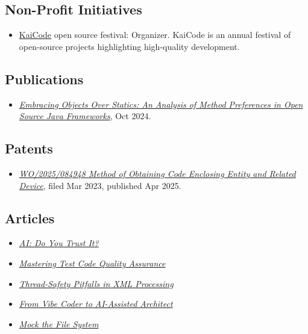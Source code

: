 \documentclass{vl}
\begin{document}
    \subsection*{Non-Profit Initiatives}
    \begin{itemize}
        \itemsep0em
        \item \href{https://www.kaicode.org}{KaiCode} open source festival: Organizer.
        KaiCode is an annual festival of open-source projects highlighting high-quality development.
    \end{itemize}

    \subsection*{Publications}
    \begin{itemize}
        \itemsep0em
        \item\emph{\href{https://arxiv.org/abs/2410.05631}{Embracing Objects Over Statics:
        An Analysis of Method Preferences
        in Open Source Java Frameworks}}, Oct 2024.
    \end{itemize}

    \subsection*{Patents}
    \begin{itemize}
        \itemsep0em
        \item\emph{\href{https://patentscope.wipo.int/search/en/detail.jsf?docId=WO2025084948&_cid=P20-ME9V9B-07633-1}{WO/2025/084948 Method of Obtaining Code Enclosing Entity and Related Device}}, filed Mar 2023, published Apr 2025.
    \end{itemize}

    \subsection*{Articles}
    \begin{itemize}
        \itemsep0em
        \item\emph{\href{https://dzone.com/articles/ai-do-you-trust-it}{AI: Do You Trust It?}}
        \item\emph{\href{https://dzone.com/articles/mastering-test-code-quality-assurance}{Mastering Test Code Quality
        Assurance}}
        \item\emph{\href{https://dzone.com/articles/thread-safety-pitfalls-in-xml-processing}{Thread-Safety Pitfalls in XML Processing}}
        \item\emph{\href{https://dev.to/volodya-lombrozo/from-vibe-coder-to-ai-assisted-architect-1nao}{From Vibe Coder to AI-Assisted Architect}}
        \item\emph{\href{https://dzone.com/articles/mock-the-file-system}{Mock the File System}}
    \end{itemize}
\end{document}
